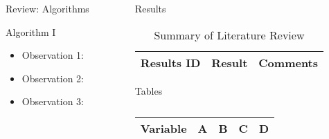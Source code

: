 \begin{frame}[t]
\begin{columns}[t]
\begin{column}{\onecolwid}
\begin{alertblock}{Review: Algorithms}
\begin{algorithm}[H]
	\begin{algorithmic}[1]
	\end{algorithmic}
\caption{Algorithm I}
\label{Algorithm_1}
\end{algorithm}
\begin{itemize}
	\item Observation 1: \\
	\item Observation 2:  \\
	\item Observation 3:  \\
\end{itemize}	
\end{alertblock}
\end{column}
\begin{column}{\onecolwid} %
\begin{alertblock}{Results}

\begin{table}[H]
	\centering
	\begin{tabular}{r|p{12cm}|l}
	\hline
	Results ID  & Result & Comments \\
	\hline
	\hline
	\end{tabular}
	\caption{Summary of Literature Review}
\end{table} 

\end{alertblock}
\begin{alertblock}{Tables}

\vspace{4pt}
\centering
\begin{table}[h]\footnotesize
	\caption{}
	\begin{tabular}{rllp{2cm}l}
		\hline	
		Variable & A & B & C & D \\
		\hline 
	\end{tabular}	
\end{table}


\end{alertblock}
\end{column}
\end{columns}
\end{frame}
